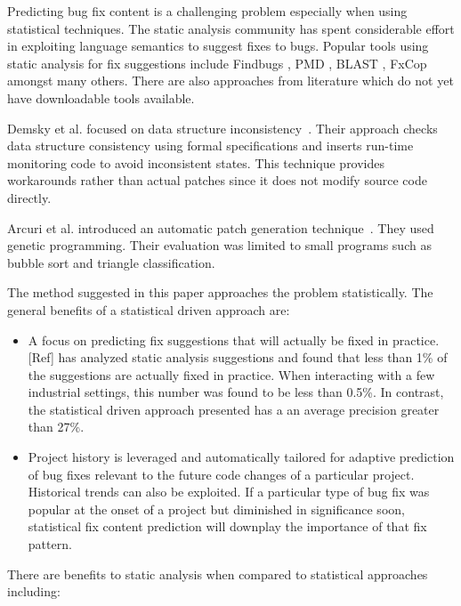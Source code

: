 \documentclass[10pt, conference, letterpaper, compsocconf]{IEEEtran}
\begin{document}
Predicting bug fix content is a challenging problem especially when
using statistical techniques. The static analysis community has spent
considerable effort in exploiting language semantics to suggest fixes
to bugs. Popular tools using static analysis for fix suggestions
include Findbugs \cite{ayewah2008using}, PMD \cite{rutar2004comparison}, BLAST \cite{muhlberg2007blast}, FxCop \cite{wagner2008evaluation} amongst many others. There are also approaches from literature which do not yet have downloadable tools available. 

Demsky et al. focused on data structure
inconsistency~\cite{demsky_data_2005,demsky_inference_2006}. Their approach
checks data structure consistency using formal specifications and inserts
run-time monitoring code to avoid inconsistent states. This technique
provides workarounds rather than actual patches since it does not modify source
code directly.

Arcuri et al. introduced an automatic patch generation
technique~\cite{arcuri_automation_2008,arcuri_multi-objective_2008,arcuri_novel_2008}. They used genetic programming. Their evaluation was limited to
small programs such as bubble sort and triangle classification.

The method suggested in this paper
approaches the problem statistically. The general benefits of a statistical
driven approach are:

\begin{itemize}
\item A focus on predicting fix suggestions that will actually be fixed in practice. [Ref]
has analyzed static analysis suggestions and found that less than
1\% of the suggestions are actually fixed in practice. When interacting
with a few industrial settings, this number was found to be less than
0.5\%. In contrast, the statistical driven approach presented has a
an average precision greater than 27\%.
\item Project history is leveraged and automatically tailored for adaptive
prediction of bug fixes relevant to the future code changes of a particular
project. Historical trends can also be exploited. If a particular
type of bug fix was popular at the onset of a project but diminished
in significance soon, statistical fix content prediction will downplay
the importance of that fix pattern.
\end{itemize}

There are benefits to static analysis when compared to statistical
approaches including:
\end{document}
